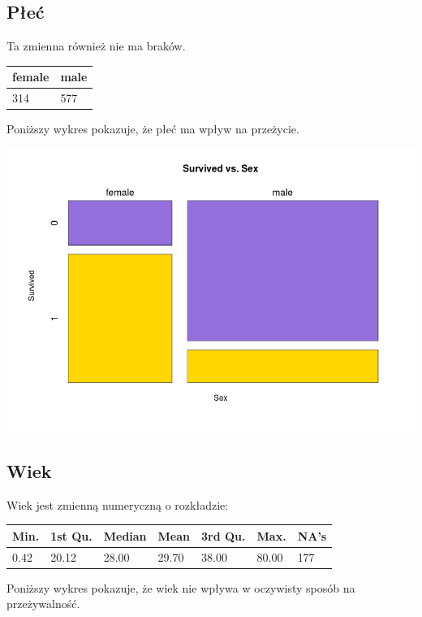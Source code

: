 \documentclass{article}
\begin{document}
\subsection{Płeć}

Ta zmienna również nie ma braków.
\begin{center}
    \begin{tabular}{| l | l |}
    \hline
	female &  male \\ \hline
	314  &  577 \\
    \hline
    \end{tabular}
\end{center}

Poniższy wykres pokazuje, że płeć ma wpływ na przeżycie.
\begin{center}
\includegraphics[scale=0.40]{images/survived-vs-sex.png}
\end{center}

\subsection{Wiek}

Wiek jest zmienną numeryczną o rozkładzie:
\begin{center}
    \begin{tabular}{| l | l | l | l | l | l | l |}
    \hline
Min. & 1st Qu. & Median   & Mean & 3rd Qu.  &  Max.  &  NA's  \\ \hline
0.42  & 20.12  & 28.00  & 29.70 &  38.00  & 80.00   &  177 \\
    \hline
    \end{tabular}
\end{center}

Poniższy wykres pokazuje, że wiek nie wpływa w oczywisty sposób na przeżywalność.
\end{document}
